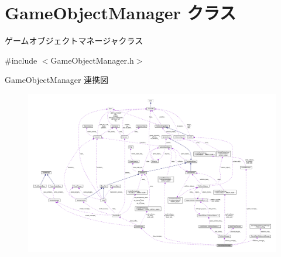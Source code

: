 \hypertarget{class_game_object_manager}{}\section{Game\+Object\+Manager クラス}
\label{class_game_object_manager}


ゲームオブジェクトマネージャクラス  




{\ttfamily \#include $<$Game\+Object\+Manager.\+h$>$}



Game\+Object\+Manager 連携図\nopagebreak
\begin{figure}[H]
\begin{center}
\leavevmode
\includegraphics[width=350pt]{class_game_object_manager__coll__graph}
\end{center}
\end{figure}
